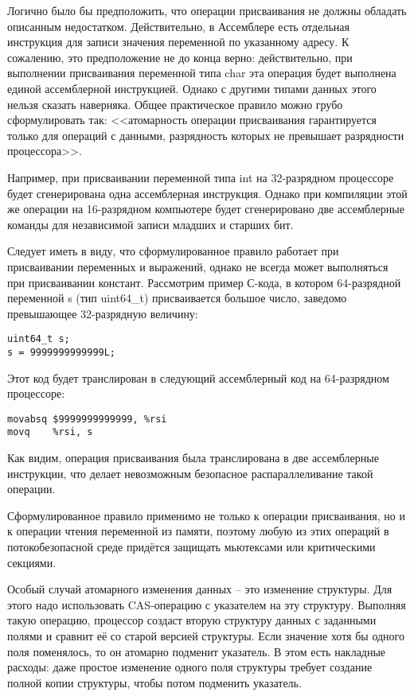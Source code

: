Логично было бы предположить, что операции присваивания не должны обладать описанным недостатком.
Действительно, в Ассемблере есть отдельная инструкция для записи значения переменной по указанному адресу.
К сожалению, это предположение не до конца верно: действительно, при выполнении присваивания переменной типа char эта операция будет выполнена единой ассемблерной инструкцией.
Однако с другими типами данных этого нельзя сказать наверняка.
Общее практическое правило можно грубо сформулировать так: <<атомарность операции присваивания гарантируется только для операций с данными, разрядность которых не превышает разрядности процессора>>.

Например, при присваивании переменной типа int на 32-разрядном процессоре будет сгенерирована одна ассемблерная инструкция.
Однако при компиляции этой же операции на 16-разрядном компьютере будет сгенерировано две ассемблерные команды для независимой записи младших и старших бит.

Следует иметь в виду, что сформулированное правило работает при присваивании переменных и выражений, однако не всегда может выполняться при присваивании констант.
Рассмотрим пример С-кода, в котором 64-разрядной переменной s (тип uint64\_t) присваивается большое число, заведомо превышающее 32-разрядную величину:

\begin{verbatim}
uint64_t s;
s = 9999999999999L;
\end{verbatim}

Этот код будет транслирован в следующий ассемблерный код на 64-разрядном процессоре:

\begin{verbatim}
movabsq $9999999999999, %rsi
movq	%rsi, s
\end{verbatim}

Как видим, операция присваивания была транслирована в две ассемблерные инструкции, что делает невозможным безопасное распараллеливание такой операции.

Сформулированное правило применимо не только к операции присваивания, но и к операции чтения переменной из памяти, поэтому любую из этих операций в потокобезопасной среде придётся защищать мьютексами или критическими секциями.

Особый случай атомарного изменения данных -- это изменение структуры.
Для этого надо использовать CAS-операцию с указателем на эту структуру.
Выполняя такую операцию, процессор создаст вторую структуру данных с заданными полями и сравнит её со старой версией структуры.
Если значение хотя бы одного поля поменялось, то он атомарно подменит указатель.
В этом есть накладные расходы: даже простое изменение одного поля структуры требует создание полной копии структуры, чтобы потом подменить указатель.
